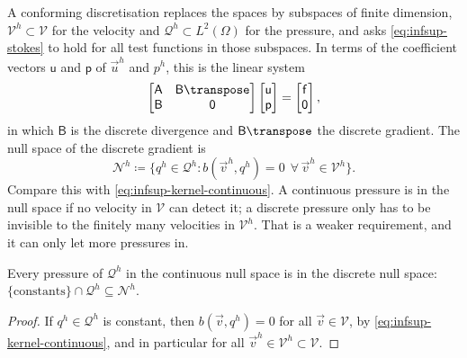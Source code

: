 A conforming discretisation replaces the spaces by subspaces of finite dimension, $\mathcal{V}^h \subset \mathcal{V}$ for the velocity and $\mathcal{Q}^h \subset L^2(\Omega)$ for the pressure, and asks \cref{eq:infsup-stokes} to hold for all test functions in those subspaces. In terms of the coefficient vectors $\mathsf{u}$ and $\mathsf{p}$ of $\vec{u}^h$ and $p^h$, this is the linear system
\begin{equation}\label{eq:infsup-matrix}
    \begin{bmatrix} \mathsf{A} & \mathsf{B}\transpose \\ \mathsf{B} & \mathsf{0} \end{bmatrix}
    \begin{bmatrix} \mathsf{u} \\ \mathsf{p} \end{bmatrix}
    =
    \begin{bmatrix} \mathsf{f} \\ \mathsf{0} \end{bmatrix} ,
\end{equation}
in which $\mathsf{B}$ is the discrete divergence and $\mathsf{B}\transpose$ the discrete gradient. The null space of the discrete gradient is
\begin{equation}\label{eq:infsup-kernel-discrete}
    \mathcal{N}^h \coloneqq \bigl\{ q^h \in \mathcal{Q}^h : b(\vec{v}^h, q^h) = 0 \ \ \forall\, \vec{v}^h \in \mathcal{V}^h \bigr\} .
\end{equation}
Compare this with \cref{eq:infsup-kernel-continuous}. A continuous pressure is in the null space if no velocity in $\mathcal{V}$ can detect it; a discrete pressure only has to be invisible to the finitely many velocities in $\mathcal{V}^h$. That is a weaker requirement, and it can only let more pressures in.

\begin{lemma}\label{lem:infsup-inclusion}
Every pressure of $\mathcal{Q}^h$ in the continuous null space is in the discrete null space:
$\{ \text{constants} \} \cap \mathcal{Q}^h \subseteq \mathcal{N}^h$.
\end{lemma}

\begin{proof}
If $q^h \in \mathcal{Q}^h$ is constant, then $b(\vec{v}, q^h) = 0$ for all $\vec{v} \in \mathcal{V}$, by \cref{eq:infsup-kernel-continuous}, and in particular for all $\vec{v}^h \in \mathcal{V}^h \subset \mathcal{V}$.
\end{proof}

